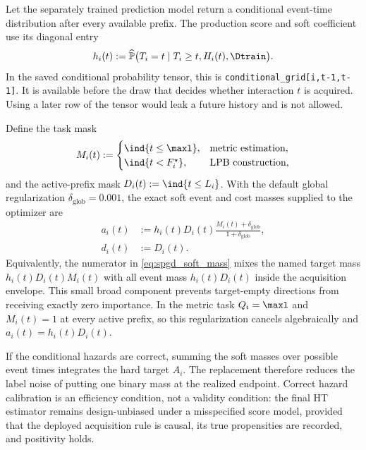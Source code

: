 Let the separately trained prediction model return a conditional event-time
distribution after every available prefix.  The production score and soft
coefficient use its diagonal entry
\begin{equation}
    h_i(t)
    :=\widehat{\mathbb P}
      \bigl(T_i=t\mid T_i\geq t,H_i(t),\Dtrain\bigr).
    \label{eq:spgd_prefix_hazard}
\end{equation}
In the saved conditional probability tensor, this is
\texttt{conditional\_grid[i,t-1,t-1]}.  It is available before the draw that
decides whether interaction $t$ is acquired.  Using a later row of the tensor
would leak a future history and is not allowed.

Define the task mask
\begin{equation}
    M_i(t):=
    \begin{cases}
      \ind{t\leq\maxl},&\text{metric estimation},\\
      \ind{t<F_i^\star},&\text{LPB construction},
    \end{cases}
    \label{eq:spgd_target_mask}
\end{equation}
and the active-prefix mask $D_i(t):=\ind{t\leq L_i}$.  With the default global
regularization $\delta_{\mathrm{glob}}=0.001$, the exact soft event and cost
masses supplied to the optimizer are
\begin{align}
    a_i(t)
    &:=h_i(t)D_i(t)
      \frac{M_i(t)+\delta_{\mathrm{glob}}}
           {1+\delta_{\mathrm{glob}}},
      \label{eq:spgd_soft_mass}\\
    d_i(t)&:=D_i(t).
      \label{eq:spgd_cost_mass}
\end{align}
Equivalently, the numerator in \eqref{eq:spgd_soft_mass} mixes the named
target mass $h_i(t)D_i(t)M_i(t)$ with all event mass
$h_i(t)D_i(t)$ inside the acquisition envelope.  This small broad component
prevents target-empty directions from receiving exactly zero importance.  In
the metric task $Q_i=\maxl$ and $M_i(t)=1$ at every active prefix, so this
regularization cancels algebraically and $a_i(t)=h_i(t)D_i(t)$.

If the conditional hazards are correct, summing the soft masses over possible
event times integrates the hard target $A_i$.  The replacement therefore
reduces the label noise of putting one binary mass at the realized endpoint.
Correct hazard calibration is an efficiency condition, not a validity
condition: the final HT estimator remains design-unbiased under a
misspecified score model, provided that the deployed acquisition rule is
causal, its true propensities are recorded, and positivity holds.

